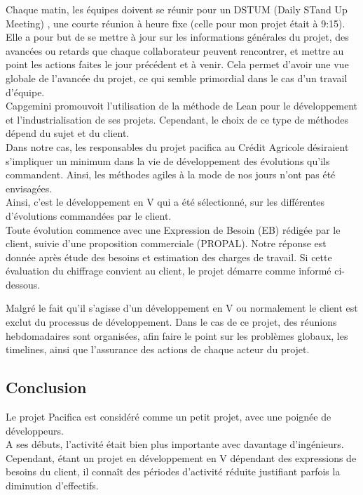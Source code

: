 \documentclass{rapport}
\begin{document}
Chaque matin, les équipes doivent se réunir pour un DSTUM (Daily STand Up Meeting) , une courte réunion à heure fixe (celle pour mon projet était à 9:15). Elle a pour but de se mettre à jour sur les informations générales du projet, des avancées ou retards que chaque collaborateur peuvent rencontrer, et mettre au point les actions faites le jour précédent et à venir. Cela permet d'avoir une vue globale de l'avancée du projet, ce qui semble primordial dans le cas d'un travail d'équipe.\\

Capgemini promouvoit l'utilisation de la méthode de Lean pour le développement et l'industrialisation de ses projets. Cependant, le choix de ce type de méthodes dépend du sujet et du client.\\ 
Dans notre cas, les responsables du projet pacifica au Crédit Agricole désiraient s'impliquer un minimum dans la vie de développement des évolutions qu'ils commandent. Ainsi, les méthodes agiles à la mode de nos jours n'ont pas été envisagées.\\

Ainsi, c'est le développement en V qui a été sélectionné, sur les différentes d'évolutions commandées par le client.\\


Toute évolution commence avec une Expression de Besoin (EB) rédigée par le client, suivie d'une proposition commerciale (PROPAL). Notre réponse est donnée après étude des besoins et estimation des charges de travail. Si cette évaluation du chiffrage convient au client, le projet démarre comme informé ci-dessous.


Malgré le fait qu'il s'agisse d'un développement en V ou normalement le client est exclut du processus de développement. Dans le cas de ce projet, des réunions hebdomadaires sont organisées, afin faire le point sur les problèmes globaux, les timelines, ainsi que l'assurance des actions de chaque acteur du projet.

\subsection*{Conclusion}

Le projet Pacifica est considéré comme un petit projet, avec une poignée de développeurs.\\
A ses débuts, l'activité était bien plus importante avec davantage d'ingénieurs. Cependant, étant un projet en développement en V dépendant des expressions de besoins du client, il connaît des périodes d'activité réduite justifiant parfois la diminution d'effectifs.\\
\end{document}
